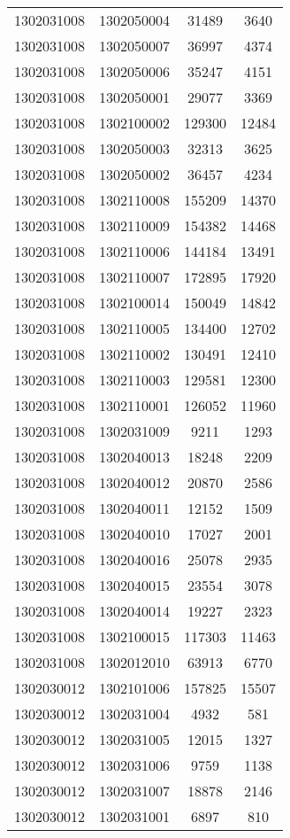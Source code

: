 \begin{longtable}{llcc}
1302031008 & 1302050004 & 31489 & 3640\\
1302031008 & 1302050007 & 36997 & 4374\\
1302031008 & 1302050006 & 35247 & 4151\\
1302031008 & 1302050001 & 29077 & 3369\\
1302031008 & 1302100002 & 129300 & 12484\\
1302031008 & 1302050003 & 32313 & 3625\\
1302031008 & 1302050002 & 36457 & 4234\\
1302031008 & 1302110008 & 155209 & 14370\\
1302031008 & 1302110009 & 154382 & 14468\\
1302031008 & 1302110006 & 144184 & 13491\\
1302031008 & 1302110007 & 172895 & 17920\\
1302031008 & 1302100014 & 150049 & 14842\\
1302031008 & 1302110005 & 134400 & 12702\\
1302031008 & 1302110002 & 130491 & 12410\\
1302031008 & 1302110003 & 129581 & 12300\\
1302031008 & 1302110001 & 126052 & 11960\\
1302031008 & 1302031009 & 9211 & 1293\\
1302031008 & 1302040013 & 18248 & 2209\\
1302031008 & 1302040012 & 20870 & 2586\\
1302031008 & 1302040011 & 12152 & 1509\\
1302031008 & 1302040010 & 17027 & 2001\\
1302031008 & 1302040016 & 25078 & 2935\\
1302031008 & 1302040015 & 23554 & 3078\\
1302031008 & 1302040014 & 19227 & 2323\\
1302031008 & 1302100015 & 117303 & 11463\\
1302031008 & 1302012010 & 63913 & 6770\\
1302030012 & 1302101006 & 157825 & 15507\\
1302030012 & 1302031004 & 4932 & 581\\
1302030012 & 1302031005 & 12015 & 1327\\
1302030012 & 1302031006 & 9759 & 1138\\
1302030012 & 1302031007 & 18878 & 2146\\
1302030012 & 1302031001 & 6897 & 810\\

\end{longtable}
